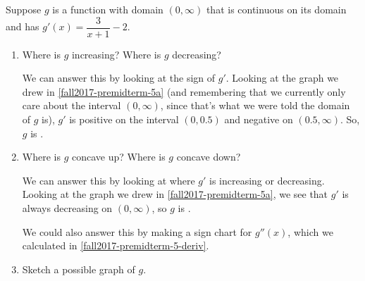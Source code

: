 \documentclass{article}
\theoremstyle{theorem}
\begin{document}
\begin{enumerate}
\begin{enumerate}[resume]
  \end{enumerate}


  Suppose $g$ is a function with domain $(0, \infty)$ that is continuous on its domain and has $g'(x) = \dfrac{3}{x + 1} - 2$.

  \begin{enumerate}[resume]
  \item
    \begin{problem}[\vfill]
      Where is $g$ increasing? Where is $g$ decreasing?
    \end{problem}

    \begin{solution}
      We can answer this by looking at the sign of $g'$. Looking at the graph we drew in \ref{fall2017-premidterm-5a} (and remembering that we currently only care about the interval $(0, \infty)$, since that's what we were told the domain of $g$ is), $g'$ is positive on the interval $(0, 0.5)$ and negative on $(0.5, \infty)$. So, $g$ is .
    \end{solution}

  \item
    \begin{problem}[\vfill\newpage]
      Where is $g$ concave up? Where is $g$ concave down?
    \end{problem}

    \begin{solution}
      We can answer this by looking at where $g'$ is increasing or decreasing.
      Looking at the graph we drew in \ref{fall2017-premidterm-5a}, we see that $g'$ is always decreasing on $(0, \infty)$, so $g$ is .

      We could also answer this by making a sign chart for $g''(x)$, which we calculated in \ref{fall2017-premidterm-5-deriv}. 
    \end{solution}

  \item \label{fall2017-premidterm-5-antideriv}

    \begin{problem}[\stretch{3}]
      Sketch a possible graph of $g$. 
    \end{problem}


\end{enumerate}
\end{enumerate}
\end{document}
